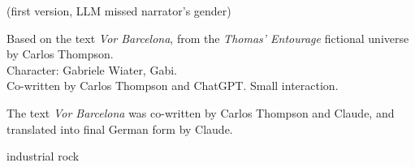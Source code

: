 
\label{sec:vor-barcelona}

\begin{notes}
(first version, LLM missed narrator's gender)

Based on the text \emph{Vor Barcelona}, from the \emph{Thomas’ Entourage} fictional universe by Carlos Thompson.\\
Character: Gabriele Wiater, Gabi.\\
Co-written by Carlos Thompson and ChatGPT. %
Small interaction.

The text \emph{Vor Barcelona} was co-written by Carlos Thompson and Claude, and translated into final German form by Claude.
\end{notes}

\begin{style}
industrial rock
\end{style}

